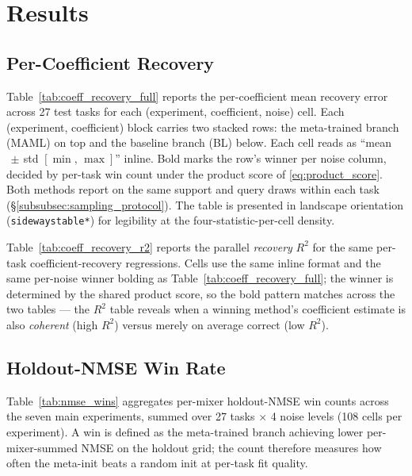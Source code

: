 \documentclass[10pt,journal,compsoc]{IEEEtran}
\begin{document}
\section{Results}\label{sec:results}

\subsection{Per-Coefficient Recovery}\label{subsec:results_coeff_recovery}

Table~\ref{tab:coeff_recovery_full} reports the per-coefficient mean
recovery error across 27 test tasks for each
(experiment, coefficient, noise) cell. Each (experiment, coefficient)
block carries two stacked rows: the meta-trained branch (MAML) on top
and the baseline branch (BL) below. Each cell reads as
``mean$\,\pm\,$std $[\min,\,\max]$'' inline. Bold marks the row's
winner per noise column, decided by per-task win count under the
product score of \eqref{eq:product_score}. Both methods report on the
same support and query draws within each task
(\S\ref{subsubsec:sampling_protocol}). The table is presented in
landscape orientation (\texttt{sidewaystable*}) for legibility at
the four-statistic-per-cell density.



Table~\ref{tab:coeff_recovery_r2} reports the parallel \emph{recovery}
$R^2$ for the same per-task coefficient-recovery regressions. Cells
use the same inline format and the same per-noise winner bolding as
Table~\ref{tab:coeff_recovery_full}; the winner is determined by the
shared product score, so the bold pattern matches across the two
tables --- the $R^2$ table reveals when a winning method's coefficient
estimate is also \emph{coherent} (high $R^2$) versus merely on average
correct (low $R^2$).



\subsection{Holdout-NMSE Win Rate}\label{subsec:results_nmse_wins}

Table~\ref{tab:nmse_wins} aggregates per-mixer holdout-NMSE win counts
across the seven main experiments, summed over 27 tasks $\times$
4 noise levels (108 cells per experiment). A win is defined as the
meta-trained branch achieving lower per-mixer-summed NMSE on the
holdout grid; the count therefore measures how often the meta-init
beats a random init at per-task fit quality.
\end{document}
